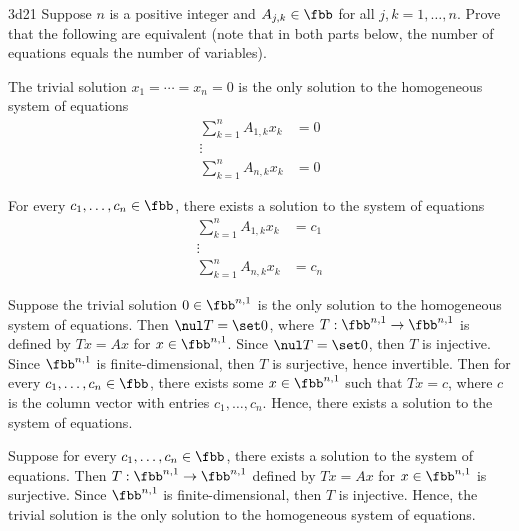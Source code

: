 \begin{exercise}{3d21}
    Suppose $n$ is a positive integer and $A_{j, k} \in \fbb$ for all $j, k = 1, \ldots, n$.
	Prove that the following are equivalent (note that in both parts below, the number of equations equals the number of variables).
    \begin{subexercises}
        \item The trivial solution $x_1 = \cdots = x_n = 0$ is the only solution to the homogeneous system of equations
        \begin{align*}
            \sum_{k = 1}^{n} A_{1, k} x_k & = 0 \\
            \vdots \\
            \sum_{k = 1}^{n} A_{n, k} x_k & = 0
        \end{align*}
        \item For every $c_1, \ldots, c_n \in \fbb$, there exists a solution to the system of equations
        \begin{align*}
            \sum_{k = 1}^{n} A_{1, k} x_k & = c_1 \\
            \vdots \\
            \sum_{k = 1}^{n} A_{n, k} x_k & = c_n
        \end{align*}
    \end{subexercises}
\end{exercise}

\begin{solenum}
    \item Suppose the trivial solution $0 \in \fbb^{n, 1}$ is the only solution to the homogeneous system of equations.
	Then $\nul T = \set 0$, where $T : \fbb^{n, 1} \to \fbb^{n, 1}$ is defined by $Tx = Ax$ for $x \in \fbb^{n, 1}$.
	Since $\nul T = \set 0$, then $T$ is injective.
	Since $\fbb^{n, 1}$ is finite-dimensional, then $T$ is surjective, hence invertible.
	Then for every $c_1, \ldots, c_n \in \fbb$, there exists some $x \in \fbb^{n, 1}$ such that $Tx = c$, where $c$ is the column vector with entries $c_1, \ldots, c_n$.
	Hence, there exists a solution to the system of equations.
    \item Suppose for every $c_1, \ldots, c_n \in \fbb$, there exists a solution to the system of equations.
	Then $T : \fbb^{n, 1} \to \fbb^{n, 1}$ defined by $Tx = Ax$ for $x \in \fbb^{n, 1}$ is surjective.
	Since $\fbb^{n, 1}$ is finite-dimensional, then $T$ is injective.
	Hence, the trivial solution is the only solution to the homogeneous system of equations.
\end{solenum}

